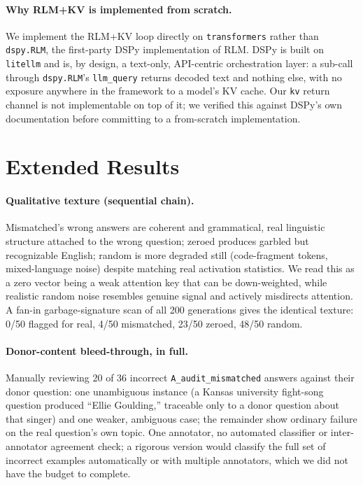 \documentclass[11pt]{article}
\begin{document}
\paragraph{Why RLM+KV is implemented from scratch.} We implement the
RLM+KV loop directly on \texttt{transformers} \citep{transformers2020}
rather than \texttt{dspy.RLM}, the first-party DSPy implementation of
RLM. DSPy is built on \texttt{litellm} and is, by design, a text-only,
API-centric orchestration layer: a sub-call through \texttt{dspy.RLM}'s
\texttt{llm\_query} returns decoded text and nothing else, with no
exposure anywhere in the framework to a model's KV cache. Our
\texttt{kv} return channel is not implementable on top of it; we
verified this against DSPy's own documentation before committing to a
from-scratch implementation.

\section{Extended Results}
\label{app:results-ext}

\paragraph{Qualitative texture (sequential chain).} Mismatched's wrong
answers are coherent and grammatical, real linguistic structure
attached to the wrong question; zeroed produces garbled but
recognizable English; random is more degraded still (code-fragment
tokens, mixed-language noise) despite matching real activation
statistics. We read this as a zero vector being a weak attention key
that can be down-weighted, while realistic random noise resembles
genuine signal and actively misdirects attention. A fan-in
garbage-signature scan of all 200 generations gives the identical
texture: 0/50 flagged for real, 4/50 mismatched, 23/50 zeroed, 48/50
random.

\paragraph{Donor-content bleed-through, in full.} Manually reviewing 20
of 36 incorrect \texttt{A\_audit\_mismatched} answers against their
donor question: one unambiguous instance (a Kansas university
fight-song question produced ``Ellie Goulding,'' traceable only to a
donor question about that singer) and one weaker, ambiguous case; the
remainder show ordinary failure on the real question's own topic. One
annotator, no automated classifier or inter-annotator agreement check;
a rigorous version would classify the full set of incorrect examples
automatically or with multiple annotators, which we did not have the
budget to complete.
\end{document}
